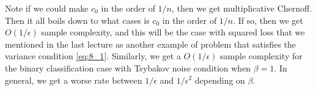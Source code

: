 \documentclass[twoside]{article}
\begin{document}
Note if we could make $c_0$ in the order of $1/n$, then we get multiplicative Chernoff.  Then it all boils down to what cases is $c_0$ in the order of $1/n$.  If so, then we get $O(1/\epsilon)$ sample complexity, and this will be the case with squared loss that we mentioned in the last lecture as another example of problem that satisfies the variance condition \cref{eq:8_1}.  Similarly, we get a $O(1/\epsilon)$ sample complexity for the binary classification case with Tsybakov noise condition when $\beta = 1$.  In general, we get a worse rate between $1/\epsilon$ and $1/\epsilon^2$ depending on $\beta$. 
\end{document}
